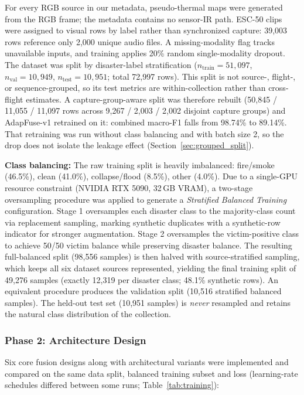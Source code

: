 \documentclass[journal]{IEEEtran}
\begin{document}
For every RGB source in our metadata, pseudo-thermal maps were generated from the RGB frame; the metadata contains no sensor-IR path. ESC-50 clips were assigned to visual rows by label rather than synchronized capture: 39{,}003 rows reference only 2{,}000 unique audio files. A missing-modality flag tracks unavailable inputs, and training applies 20\% random single-modality dropout. The dataset was split by disaster-label stratification ($n_\text{train}=51{,}097$, $n_\text{val}=10{,}949$, $n_\text{test}=10{,}951$; total 72{,}997 rows). This split is not source-, flight-, or sequence-grouped, so its test metrics are within-collection rather than cross-flight estimates. A capture-group-aware split was therefore rebuilt (50{,}845 / 11{,}055 / 11{,}097 rows across 9{,}267 / 2{,}003 / 2{,}002 disjoint capture groups) and AdapFuse-v1 retrained on it: combined macro-F1 falls from 98.74\% to 89.14\%. That retraining was run without class balancing and with batch size 2, so the drop does not isolate the leakage effect (Section~\ref{sec:grouped_split}).

\textbf{Class balancing:} The raw training split is heavily imbalanced: fire/smoke (46.5\%), clean (41.0\%), collapse/flood (8.5\%), other (4.0\%). Due to a single-GPU resource constraint (NVIDIA RTX 5090, 32\,GB VRAM), a two-stage oversampling procedure was applied to generate a \textit{Stratified Balanced Training} configuration. Stage 1 oversamples each disaster class to the majority-class count via replacement sampling, marking synthetic duplicates with a synthetic-row indicator for stronger augmentation. Stage 2 oversamples the victim-positive class to achieve 50/50 victim balance while preserving disaster balance. The resulting full-balanced split (98{,}556 samples) is then halved with source-stratified sampling, which keeps all six dataset sources represented, yielding the final training split of 49{,}276 samples (exactly 12{,}319 per disaster class; 48.1\% synthetic rows). An equivalent procedure produces the validation split (10{,}516 stratified balanced samples). The held-out test set (10{,}951 samples) is \emph{never} resampled and retains the natural class distribution of the collection.

\subsubsection{Phase 2: Architecture Design}

Six core fusion designs along with architectural variants were implemented and compared on the same data split, balanced training subset and loss (learning-rate schedules differed between some runs; Table~\ref{tab:training}):
\end{document}
